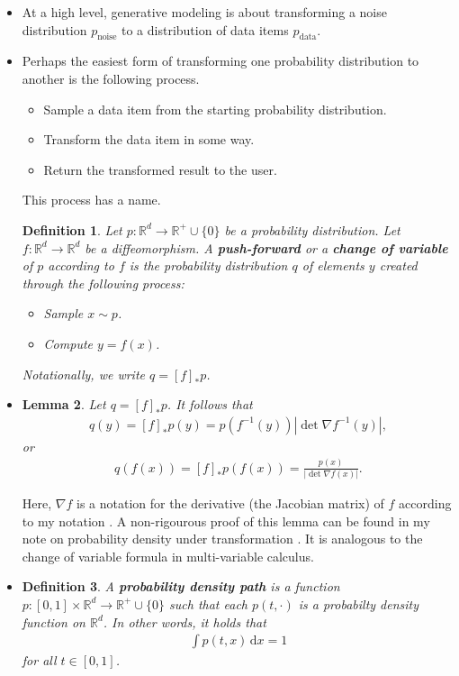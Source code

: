 \documentclass[10pt]{article}
\newtheorem{lemma}{Lemma}
\newtheorem{definition}[lemma]{Definition}
\newcommand{\dee}{\mathrm{d}}
\newcommand{\mrm}[1]{\mathrm{#1}}
\newcommand{\Real}{\mathbb{R}}
\newcommand{\data}{\mathrm{data}}
\begin{document}
\begin{itemize}
  \item At a high level, generative modeling is about transforming a noise distribution $p_{\mrm{noise}}$ to a distribution of data items $p_{\data}$.
  
  \item Perhaps the easiest form of transforming one probability distribution to another is the following process.
  \begin{itemize}
    \item Sample a data item from the starting probability distribution.
    \item Transform the data item in some way.
    \item Return the transformed result to the user.
  \end{itemize}
  This process has a name.
  \begin{definition}
    Let $p: \Real^d \rightarrow \Real^{+}\cup \{0\}$ be a probability distribution. Let $f: \Real^d \rightarrow \Real^d$ be a diffeomorphism. A {\bf push-forward} or a {\bf change of variable} of $p$ according to $f$ is the probability distribution $q$ of elements $y$ created through the following process:
    \begin{itemize}
      \item Sample $x \sim p$.
      \item Compute $y = f(x)$.
    \end{itemize}
    Notationally, we write $q = [f]_* p$.
  \end{definition}

  \item \begin{lemma}
    Let $q = [f]_*p$. It follows that
    \begin{align*}
      q(y) = [f]_*p(y) = p(f^{-1}(y)) | \det \nabla f^{-1}(y) |,
    \end{align*}
    or
    \begin{align*}
      q(f(x)) = [f]_*p(f(x)) = \frac{p(x)}{|\det \nabla f(x)|}.
    \end{align*}    
  \end{lemma}
  Here, $\nabla f$ is a notation for the derivative (the Jacobian matrix) of $f$ according to my notation \cite{Khungurn:Notation}. A non-rigourous proof of this lemma can be found in my note on probability density under transformation \cite{Khungurn:ProbXform}. It is analogous to the change of variable formula in multi-variable calculus.

  \item \begin{definition} A {\bf probability density path} is a function $p: [0,1] \times \Real^d \rightarrow \Real^{+} \cup \{0\}$ such that each $p(t,\cdot)$ is a probabilty density function on $\Real^d$. In other words, it holds that
    \begin{align*}
      \int p(t,x)\, \dee x = 1
    \end{align*}
    for all $t \in [0,1]$.
    \end{definition}


\end{itemize}
\end{document}
